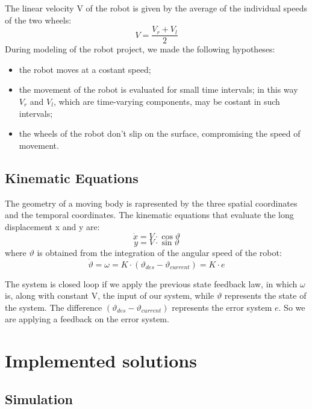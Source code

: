 \documentclass[a4paper,11pt,oneside]{book}
\begin{document}
The linear velocity V of the robot is given by the average of the individual speeds of the two wheels:
\begin{equation}
V=\frac{V_r + V_l}{2}
\end{equation}
During  modeling  of  the  robot  project,  we  made the following hypotheses:
\begin{itemize}
\item the robot moves at a costant speed;
\item the movement of the robot is evaluated for small time intervals; in this way $V_r$ and $V_l$, which are time-varying components, may be costant in such intervals; 
\item the wheels of the robot don't slip on the surface, compromising the speed of movement.
\end{itemize}

\subsection {Kinematic Equations}
The geometry of a moving body is rapresented by the three spatial coordinates and the temporal coordinates. The kinematic equations that evaluate the long displacement x and y are:
\begin{displaymath}
\dot{x} = V \cdot \cos{\vartheta}
\end{displaymath}
\begin{displaymath}
\dot{y} = V \cdot \sin{\vartheta}
\end{displaymath}
where $\vartheta$ is obtained from the integration of the angular speed of the robot:
\begin{displaymath}
\dot{\vartheta} = \omega = K \cdot (\vartheta_{des} - \vartheta_{current}) = K \cdot e
\end{displaymath}

The system is closed loop if we apply the previous state feedback law, in which $\omega$ is, along with constant V, the input of our system, while $\vartheta$ represents the state of the system. The difference $(\vartheta_{des} - \vartheta_{current})$ represents the error system $e$. So we are applying a feedback on the error system.

\section{Implemented solutions}
\subsection {Simulation}
\end{document}
